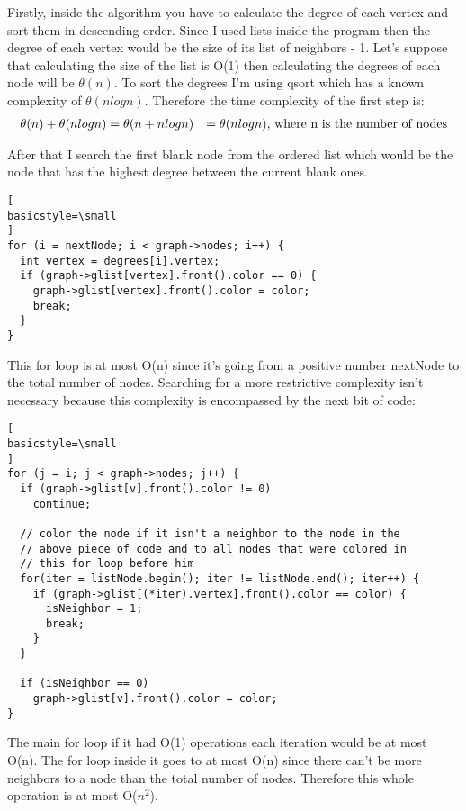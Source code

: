 \documentclass[runningheads]{llncs}
\begin{document}
Firstly, inside the algorithm you have to calculate the degree of each vertex and sort them in descending order.
Since I used lists inside the program then the degree of each vertex would be the size of its list of neighbors
- 1. Let's suppose that calculating the size of the list is O(1) then calculating the degrees of each node
will be $\theta(n)$. To sort the degrees I'm using qsort which has a known complexity of $\theta(nlogn)$.
Therefore the time complexity of the first step is:
\begin{align*}
\theta(n) + \theta(nlogn) &= \theta(n + nlogn)
						  &= \theta(nlogn) \textnormal{, where n is the number of nodes}
\end{align*}

After that I search the first blank node from the ordered list which would be the node that has
the highest degree between the current blank ones.

\begin{lstlisting}[
basicstyle=\small
]
for (i = nextNode; i < graph->nodes; i++) {
  int vertex = degrees[i].vertex;
  if (graph->glist[vertex].front().color == 0) {
    graph->glist[vertex].front().color = color;
    break;
  }
}
\end{lstlisting}
\vspace{1em}
This for loop is at most O(n) since it's going from a positive number nextNode to the total number of
nodes. Searching for a more restrictive complexity isn't necessary because this complexity is
encompassed by the next bit of code:

\begin{lstlisting}[
basicstyle=\small
]
for (j = i; j < graph->nodes; j++) {
  if (graph->glist[v].front().color != 0)
	continue;

  // color the node if it isn't a neighbor to the node in the
  // above piece of code and to all nodes that were colored in
  // this for loop before him
  for(iter = listNode.begin(); iter != listNode.end(); iter++) {
    if (graph->glist[(*iter).vertex].front().color == color) {
      isNeighbor = 1;
      break;
    }
  }

  if (isNeighbor == 0)
    graph->glist[v].front().color = color;
}
\end{lstlisting}
\vspace{1em}
The main for loop if it had O(1) operations each iteration would be at most O(n). The for
loop inside it goes to at most O(n) since there can't be more neighbors to a node
than the total number of nodes. Therefore this whole operation is at most O($n^2$).
\end{document}
